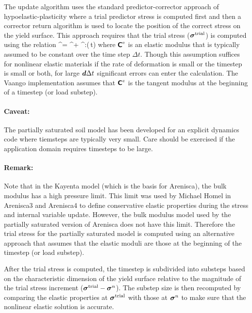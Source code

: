 The update algorithm uses the standard predictor-corrector approach of hypoelastic-plasticity
where a trial predictor stress is computed first and then a corrector return algorithm is used to
locate the position of the correct stress on the yield surface. This approach requires that
the trial stress ($\boldsymbol{\sigma}^{\text{trial}}$) is computed using the relation
\Beq
  \Bsig^\Trial = \Bsig^\Tn + \SfC^\Te:(\Bd\,\Delta t)
\Eeq
where $\boldsymbol{\mathsf{C}}^{\text{e}}$ is an elastic modulus that is typically assumed to be constant over the time 
step $\Delta t$.  Though this assumption suffices for nonlinear elastic materials if the rate of 
deformation is small or the timestep is small or both, for large $\boldsymbol{d} \Delta t$ significant errors
can enter the calculation.  {\Ochre The Vaango implementation assumes that $\boldsymbol{\mathsf{C}}^e$ is the tangent 
modulus at the beginning of a timestep (or load substep).}

\paragraph{Caveat:}
The partially saturated soil model has been developed for an explicit dynamics code where 
tiemsteps are typically very small.  Care should be exercised if the application domain
requires timesteps to be large.

\paragraph{Remark:}
{\footnotesize
Note that in the Kayenta model (which is the basis for Arenisca), the bulk modulus has a high pressure 
limit.  This limit was used by Michael Homel in Arenisca3 and Arenisca4 to define conservative elastic
properties during the stress and internal variable update.  However, the bulk modulus model used 
by the partially saturated version of Arenisca does not have this limit.  Therefore the trial stress
for the partially saturated model is computed using an alternative approach that assumes that
the elastic moduli are those at the beginning of the timestep (or load substep).
}

After the trial stress is computed, the timestep is subdivided into substeps based on the 
characteristic dimension of the yield surface relative to the magnitude of the trial stress 
increment ($\boldsymbol{\sigma}^{\text{trial}} - \boldsymbol{\sigma}^n$).  The substep size is then recomputed by comparing the
elastic properties at $\boldsymbol{\sigma}^{\text{trial}}$ with those at $\boldsymbol{\sigma}^n$ to make sure that the nonlinear
elastic solution is accurate.
 
